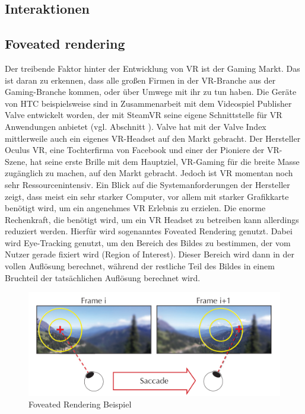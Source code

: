 \subsection{Interaktionen}


\subsection{Foveated rendering}
Der treibende Faktor hinter der Entwicklung von VR ist der Gaming Markt. Das ist daran zu erkennen, dass alle großen Firmen in der VR-Branche aus der Gaming-Branche kommen, oder über Umwege mit ihr zu tun haben. Die Geräte von HTC beispielsweise sind in Zusammenarbeit mit dem Videospiel Publisher Valve entwickelt worden, der mit SteamVR seine eigene Schnittstelle für VR Anwendungen anbietet (vgl. Abschnitt ). Valve hat mit der Valve Index mittlerweile auch ein eigenes VR-Headset auf den Markt gebracht. Der Hersteller Oculus VR, eine Tochterfirma von Facebook und einer der Pioniere der VR-Szene, hat seine erste Brille mit dem Hauptziel, VR-Gaming für die breite Masse zugänglich zu machen, auf den Markt gebracht\cite{OculusKickstarter}. Jedoch ist VR momentan noch sehr Ressourcenintensiv. Ein Blick auf die Systemanforderungen der Hersteller zeigt, dass meist ein sehr starker Computer, vor allem mit starker Grafikkarte benötigt wird, um ein angenehmes VR Erlebnis zu erzielen\cite{Lang.2019}. Die enorme Rechenkraft, die benötigt wird, um ein VR Headset zu betreiben kann allerdings reduziert werden. Hierfür wird sogenanntes Foveated Rendering genutzt. Dabei wird Eye-Tracking genutzt, um den Bereich des Bildes zu bestimmen, der vom Nutzer gerade fixiert wird (Region of Interest). Dieser Bereich wird dann in der vollen Auflösung berechnet, während der restliche Teil des Bildes in einem Bruchteil der tatsächlichen Auflösung berechnet wird. 
\begin{figure}
	\includegraphics[width=\linewidth]{images/foveated_rendering}
	\caption{Foveated Rendering Beispiel \cite{Albert.2017}}
	\label{fig:foveated}
\end{figure}


